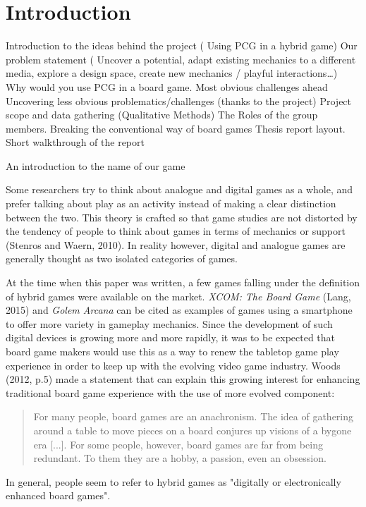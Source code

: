 \chapter{Introduction}
Introduction to the ideas behind the project  ( Using PCG in a hybrid game)
Our problem statement ( Uncover a potential, adapt existing mechanics to a different media, explore a design space, create new mechanics / playful interactions…)
Why would you use PCG in a board game.
Most obvious challenges ahead
Uncovering less obvious problematics/challenges (thanks to the project)
Project scope and data gathering (Qualitative Methods)
The Roles of the group members.
Breaking the conventional way of board games
Thesis report layout. Short walkthrough of the report

An introduction to the name of our game

Some researchers try to think about analogue and digital games as a whole, and prefer talking about play as an activity instead of making a clear distinction between the two. This theory is crafted so that game studies are not distorted by the tendency of people to think about games in terms of mechanics or support%
(Stenros and Waern, 2010). In reality however, digital and analogue games are generally thought as two isolated categories of games.

At the time when this paper was written, a few games falling under the definition of hybrid games were available on the market. \textit{XCOM: The Board Game} (Lang, 2015)\cite{game:xcomtbg} and \textit{Golem Arcana} can be cited as examples of games using a smartphone to offer more variety in gameplay mechanics. Since the development of such digital devices is growing more and more rapidly, it was to be expected that board game makers would use this as a way to renew the tabletop game play experience in order to keep up with the evolving video game industry. Woods (2012, p.5) made a statement that can explain this growing interest for enhancing traditional board game experience with the use of more evolved component:

\begin{quotation}
For many people, board games are an anachronism. The idea of gathering around a table to move pieces on a board conjures up visions of a bygone era [...]. For some people, however, board games are far from being redundant. To them they are a hobby, a passion, even an obsession.
\end{quotation}

In general, people seem to refer to hybrid games as "digitally or electronically enhanced board games". 


